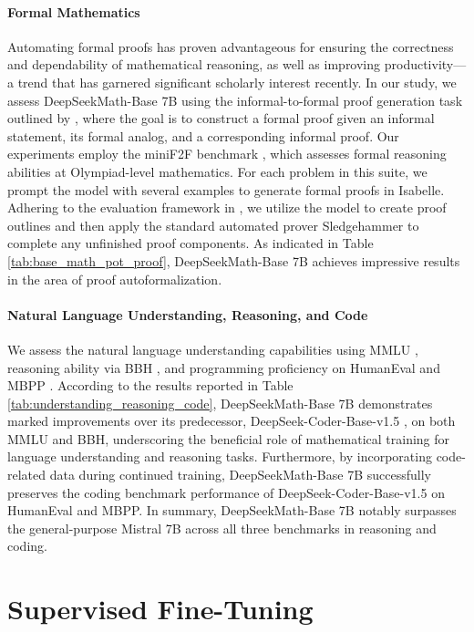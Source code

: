 \begin{itemize}[topsep=0pt]
\paragraph{Formal Mathematics}

Automating formal proofs has proven advantageous for ensuring the correctness and dependability of mathematical reasoning, as well as improving productivity—a trend that has garnered significant scholarly interest recently. In our study, we assess DeepSeekMath-Base 7B using the informal-to-formal proof generation task outlined by \citep{dsp_proof}, where the goal is to construct a formal proof given an informal statement, its formal analog, and a corresponding informal proof. Our experiments employ the miniF2F benchmark \citep{minif2f}, which assesses formal reasoning abilities at Olympiad-level mathematics. For each problem in this suite, we prompt the model with several examples to generate formal proofs in Isabelle. Adhering to the evaluation framework in \cite{dsp_proof}, we utilize the model to create proof outlines and then apply the standard automated prover Sledgehammer \citep{sledgehammer} to complete any unfinished proof components. As indicated in Table \ref{tab:base_math_pot_proof}, DeepSeekMath-Base 7B achieves impressive results in the area of proof autoformalization.

\paragraph{Natural Language Understanding, Reasoning, and Code}

We assess the natural language understanding capabilities using MMLU \citep{mmlu}, reasoning ability via BBH \citep{bbh}, and programming proficiency on HumanEval \citep{codex} and MBPP \citep{mbpp}. According to the results reported in Table \ref{tab:understanding_reasoning_code}, DeepSeekMath-Base 7B demonstrates marked improvements over its predecessor, DeepSeek-Coder-Base-v1.5 \citep{deepseek-coder}, on both MMLU and BBH, underscoring the beneficial role of mathematical training for language understanding and reasoning tasks. Furthermore, by incorporating code-related data during continued training, DeepSeekMath-Base 7B successfully preserves the coding benchmark performance of DeepSeek-Coder-Base-v1.5 on HumanEval and MBPP. In summary, DeepSeekMath-Base 7B notably surpasses the general-purpose Mistral 7B \citep{mistral} across all three benchmarks in reasoning and coding.

\section{Supervised Fine-Tuning}


\end{itemize}
